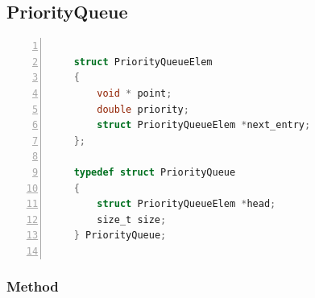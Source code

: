 \documentclass[twoside,12pt, a4paper]{report}
\begin{document}
\subsection{PriorityQueue}

\begin{lstlisting}[language=C, % Spécifie le langage du code
	caption={PriorityQueue}, % Légende du listing
	label=lst:prqueue_c, % Étiquette pour référencer le listing
	numbers=left, 
	numberstyle=\tiny\color{gray}, 
	stepnumber=1, 
	frame=single,
	breaklines=true, 
	postbreak=\mbox{\textcolor{red}{$\hookrightarrow$}\space},
	showstringspaces=false 
	]
	
	struct PriorityQueueElem
	{
		void * point;
		double priority;
		struct PriorityQueueElem *next_entry;
	};
	
	typedef struct PriorityQueue
	{
		struct PriorityQueueElem *head;
		size_t size;
	} PriorityQueue;
	
\end{lstlisting}

\subsubsection{Method}
\end{document}
